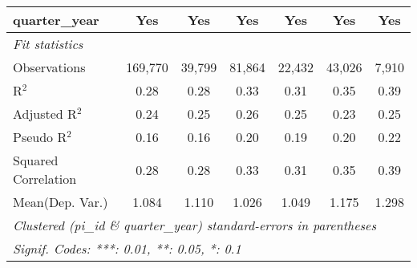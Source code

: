 \begin{tabular}{lcccccc}
   quarter\_year                                              & Yes           & Yes          & Yes          & Yes           & Yes           & Yes\\  
   \midrule
   \emph{Fit statistics}\\
   Observations                                               & 169,770       & 39,799       & 81,864       & 22,432        & 43,026        & 7,910\\  
   R$^2$                                                      & 0.28          & 0.28         & 0.33         & 0.31          & 0.35          & 0.39\\  
   Adjusted R$^2$                                             & 0.24          & 0.25         & 0.26         & 0.25          & 0.23          & 0.25\\  
   Pseudo R$^2$                                               & 0.16          & 0.16         & 0.20         & 0.19          & 0.20          & 0.22\\  
   Squared Correlation                                        & 0.28          & 0.28         & 0.33         & 0.31          & 0.35          & 0.39\\  
Mean(Dep. Var.) & 1.084 & 1.110 & 1.026 & 1.049 & 1.175 & 1.298 \\
   \midrule \midrule
   \multicolumn{7}{l}{\emph{Clustered (pi\_id \& quarter\_year) standard-errors in parentheses}}\\
   \multicolumn{7}{l}{\emph{Signif. Codes: ***: 0.01, **: 0.05, *: 0.1}}\\
\end{tabular}
\par\endgroup
